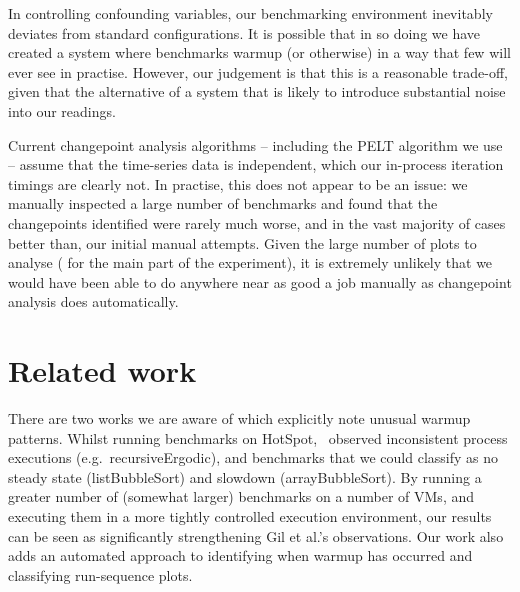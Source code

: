 \documentclass[acmsmall]{acmart}\settopmatter{printfolios=true}
\begin{document}
In controlling confounding variables, our benchmarking environment inevitably
deviates from standard configurations. It is possible that in so doing we have
created a system where benchmarks warmup (or otherwise) in a way that few will ever see in
practise. However, our judgement is that this is a reasonable trade-off,
given that the alternative of a
system that is likely to introduce substantial noise into our readings.

Current changepoint analysis algorithms -- including the PELT algorithm we use
-- assume that the time-series data is independent, which our in-process
iteration timings are clearly not. In practise, this does not appear to be an
issue: we manually inspected a large number of benchmarks and found that the
changepoints identified were rarely much worse, and in the vast majority of
cases better than, our initial manual attempts. Given the large number of
plots to analyse (\totalpexecs{} for the main part of the experiment), it is extremely unlikely that
we would have been able to do anywhere near as good a job manually as
changepoint analysis does automatically.


\section{Related work}
\label{sec:related}

There are two works we are aware of which explicitly note unusual warmup
patterns. Whilst running benchmarks on HotSpot,~\citet{gil11microbenchmark}
observed inconsistent process executions
(e.g.~recursiveErgodic), and benchmarks that we could classify as no
steady state (listBubbleSort) and slowdown (arrayBubbleSort). By running a
greater number of (somewhat larger) benchmarks on a number of VMs, and executing
them in a more tightly controlled execution environment, our results can be seen
as significantly strengthening Gil et al.'s observations. Our work also adds an
automated approach to identifying when warmup has occurred and classifying
run-sequence plots.
\end{document}
